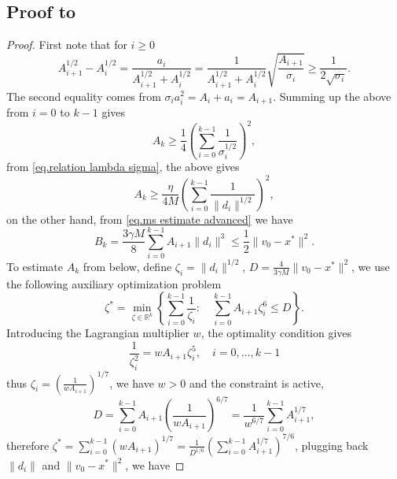 \documentclass{mcom-l}
\numberwithin{equation}{section}
\begin{document}
\subsection*{Proof to }
\begin{proof}
    First note that for $i\geq 0$
    \begin{equation*}
        A_{i+1}^{1/2}-A_i^{1/2} = \frac{a_i}{A_{i+1}^{1/2}+A_i^{1/2}}=\frac{1}{A_{i+1}^{1/2}+A_i^{1/2}}\sqrt{\frac{A_{i+1}}{\sigma_i}}\geq \frac{1}{2\sqrt{\sigma_i}}.
    \end{equation*}
    The second equality comes from $\sigma_ia_i^2=A_i+a_i=A_{i+1}$. Summing up the above from $i=0$ to $k-1$ gives
    \begin{equation*}
        A_k \geq \frac{1}{4} \left (\sum_{i=0}^{k-1}\frac{1}{\sigma_i^{1/2}}\right)^2,
    \end{equation*}
    from \eqref{eq.relation lambda sigma}, the above gives
    \begin{equation}\label{eq.Ak helper 1}
        A_k \geq \frac{\eta}{4M} \left (\sum_{i=0}^{k-1} \frac{1}{\|d_i\|^{1/2}}\right)^2,
    \end{equation}
    on the other hand, from \eqref{eq.ms estimate advanced} we have
    \begin{equation*}
        B_k = \frac{3\gamma M}{8}\sum_{i=0}^{k-1} A_{i+1}\|d_i\|^3 \leq \frac{1}{2}\|v_0-x^*\|^2.
    \end{equation*}
    To estimate $A_k$ from below, define $\zeta_i = \|d_i\|^{1/2}$, $D = \frac{4}{3\gamma M}\|v_0-x^*\|^2$, we use the following auxiliary optimization problem
    \begin{equation*}
        \zeta^*=\min _{\zeta \in \mathbb{R}^k}\left\{\sum_{i=0}^{k-1} \frac{1}{\zeta_i}: \quad \sum_{i=0}^{k-1} A_{i+1} \zeta_i^6 \leq D\right\}.
    \end{equation*}
    Introducing the Lagrangian multiplier $w$, the optimality condition gives
    \begin{equation*}
        \frac{1}{\zeta_i^2}=w A_{i+1} \zeta_i^5, \quad i=0, \ldots, k-1
    \end{equation*}
    thus $\zeta_i = \left( \frac{1}{w A_{i+1}}\right)^{1/7}$, we have $w>0$ and the constraint is active,
    \begin{equation*}
        D=\sum_{i=0}^{k-1} A_{i+1}\left(\frac{1}{w A_{i+1}}\right)^{6 / 7}=\frac{1}{w^{6 / 7}} \sum_{i=0}^{k-1} A_{i+1}^{1 / 7},
    \end{equation*}
    therefore $\zeta^*=\sum_{i=0}^{k-1}\left(w A_{i+1}\right)^{1 / 7}=\frac{1}{D^{1 / 6}}\left(\sum_{i=0}^{k-1} A_{i+1}^{1 / 7}\right)^{7 / 6}$, plugging back $\|d_i\| $ and $ \|v_0-x^*\|^2$, we have

\end{proof}
\end{document}
